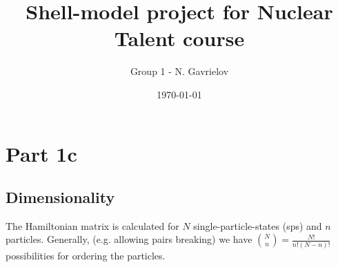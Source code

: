 \documentclass[aps,prl,groupedaddress]{revtex4-1}  %
\begin{document}
\title{Shell-model project for Nuclear Talent course}


\author{Group 1 - N. Gavrielov}
\affiliation{}


\date{\today}

\begin{abstract}
\end{abstract}

\pacs{}

\maketitle
\section{Part 1c}
\subsection{Dimensionality}
The Hamiltonian matrix is calculated for $N$ single-particle-states (sps) and $n$ particles. Generally, (e.g. allowing pairs breaking) we have ${N \choose n}=\frac{N!}{n!(N-n)!}$ possibilities for ordering the particles. 
\end{document}
